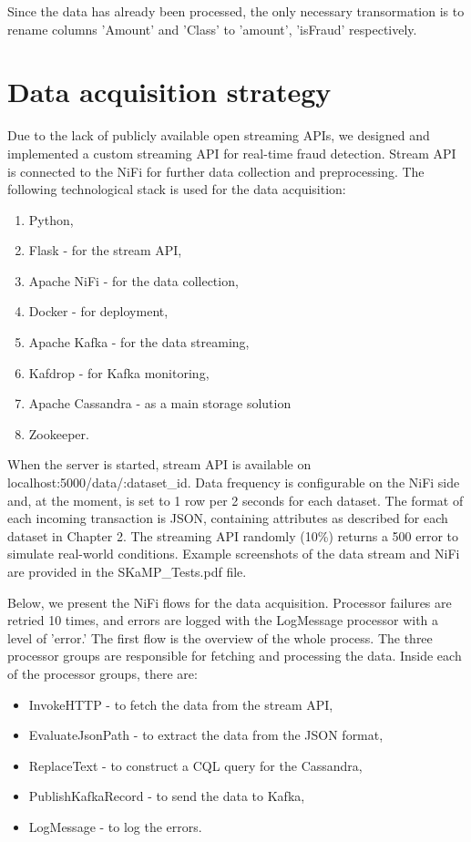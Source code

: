 \documentclass[12pt,a4paper, hidelinks]{article}
\begin{document}
Since the data has already been processed, the only necessary transormation is to rename columns 'Amount' and 'Class' to 'amount', 'isFraud' respectively.

\newpage

\section{Data acquisition strategy}

Due to the lack of publicly available open streaming APIs, we designed and implemented a custom streaming API for real-time fraud detection. Stream API is connected to the NiFi for further data collection and preprocessing. The following technological stack is used for the data acquisition:

\begin{enumerate}
    \item Python,
    \item Flask  - for the stream API,
    \item Apache NiFi - for the data collection,
    \item Docker - for deployment,
    \item Apache Kafka - for the data streaming,
    \item Kafdrop - for Kafka monitoring,
    \item Apache Cassandra - as a main storage solution
    \item Zookeeper.
\end{enumerate}

When the server is started, stream API is available on localhost:5000/data/:dataset\_id. Data frequency is configurable on the NiFi side and, at the moment, is set to 1 row per 2 seconds for each dataset. The format of each incoming transaction is JSON, containing attributes as described for each dataset in Chapter 2. The streaming API randomly (10\%) returns a 500 error to simulate real-world conditions. Example screenshots of the data stream and NiFi are provided in the SKaMP\_Tests.pdf file.

Below, we present the NiFi flows for the data acquisition. Processor failures are retried 10 times, and errors are logged with the LogMessage processor with a level of 'error.' The first flow is the overview of the whole process. The three processor groups are responsible for fetching and processing the data. Inside each of the processor groups, there are:
\begin{itemize}
    \item InvokeHTTP - to fetch the data from the stream API,
    \item EvaluateJsonPath - to extract the data from the JSON format,
    \item ReplaceText - to construct a CQL query for the Cassandra,
    \item PublishKafkaRecord - to send the data to Kafka,
    \item LogMessage - to log the errors.
\end{itemize}
\end{document}

